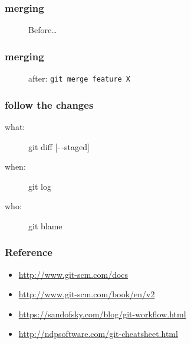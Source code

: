 \begin{frame}
    \frametitle{merging}
    \begin{figure}[b]{\textwidth}
        \centering
        \caption{Before\ldots}
    \end{figure}
\end{frame}

\begin{frame}
    \frametitle{merging}
    \begin{figure}[b]{\textwidth}
        \centering
        \caption{after: \texttt{git merge feature X}}
    \end{figure}
\end{frame}

\begin{frame}
    \frametitle{follow the changes}
    \begin{description}
        \item[what:] git diff [-\,-staged]
        \item[when:] git log
        \item[who:] git blame
    \end{description}
\end{frame}

\begin{frame}
    \frametitle{Reference}
    \begin{itemize}
        \item \url{http://www.git-scm.com/docs} %
        \item \url{http://www.git-scm.com/book/en/v2} %
        \item \url{https://sandofsky.com/blog/git-workflow.html} %
        \item \url{http://ndpsoftware.com/git-cheatsheet.html} %
    \end{itemize}
\end{frame}
